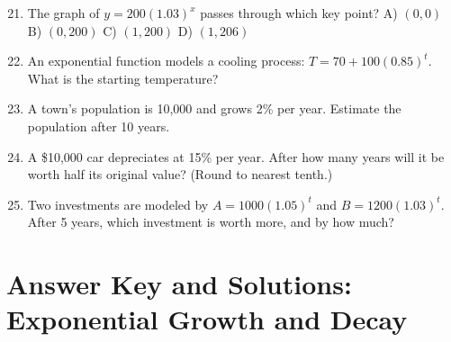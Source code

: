 \documentclass[14pt]{extarticle}
\begin{document}
\begin{enumerate}
  \setcounter{enumi}{20}
  \item The graph of \(y = 200(1.03)^x\) passes through which key point?
  A) \((0, 0)\) \quad B) \((0, 200)\) \quad C) \((1, 200)\) \quad D) \((1, 206)\)

  \item An exponential function models a cooling process: \(T = 70 + 100(0.85)^t.\)  
  What is the starting temperature?

  \item A town’s population is 10,000 and grows 2\% per year.  
  Estimate the population after 10 years.

  \item A \$10,000 car depreciates at 15\% per year.  
  After how many years will it be worth half its original value? (Round to nearest tenth.)

  \item Two investments are modeled by  
  \(A = 1000(1.05)^t\) and \(B = 1200(1.03)^t.\)  
  After 5 years, which investment is worth more, and by how much?
\end{enumerate}

\newpage


\section*{Answer Key and Solutions: Exponential Growth and Decay}
\end{document}
